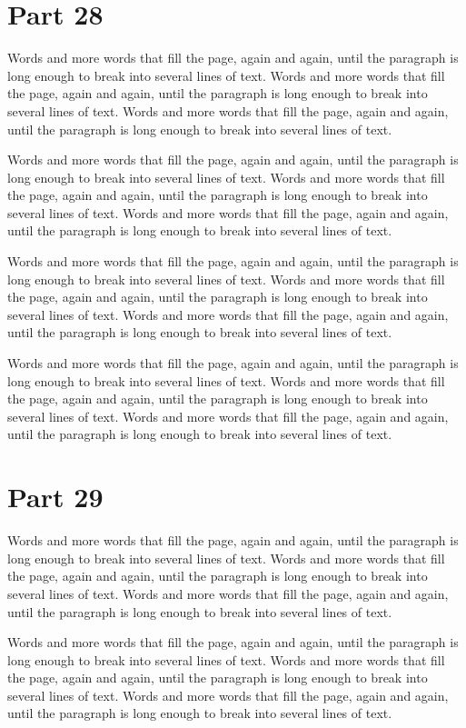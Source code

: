 \documentclass{article}
\begin{document}
\section{Part 28}
Words and more words that fill the page, again and again, until the paragraph is long enough to break into several lines of text. Words and more words that fill the page, again and again, until the paragraph is long enough to break into several lines of text. Words and more words that fill the page, again and again, until the paragraph is long enough to break into several lines of text. 

Words and more words that fill the page, again and again, until the paragraph is long enough to break into several lines of text. Words and more words that fill the page, again and again, until the paragraph is long enough to break into several lines of text. Words and more words that fill the page, again and again, until the paragraph is long enough to break into several lines of text. 

Words and more words that fill the page, again and again, until the paragraph is long enough to break into several lines of text. Words and more words that fill the page, again and again, until the paragraph is long enough to break into several lines of text. Words and more words that fill the page, again and again, until the paragraph is long enough to break into several lines of text. 

Words and more words that fill the page, again and again, until the paragraph is long enough to break into several lines of text. Words and more words that fill the page, again and again, until the paragraph is long enough to break into several lines of text. Words and more words that fill the page, again and again, until the paragraph is long enough to break into several lines of text. 

\section{Part 29}
Words and more words that fill the page, again and again, until the paragraph is long enough to break into several lines of text. Words and more words that fill the page, again and again, until the paragraph is long enough to break into several lines of text. Words and more words that fill the page, again and again, until the paragraph is long enough to break into several lines of text. 

Words and more words that fill the page, again and again, until the paragraph is long enough to break into several lines of text. Words and more words that fill the page, again and again, until the paragraph is long enough to break into several lines of text. Words and more words that fill the page, again and again, until the paragraph is long enough to break into several lines of text. 
\end{document}

